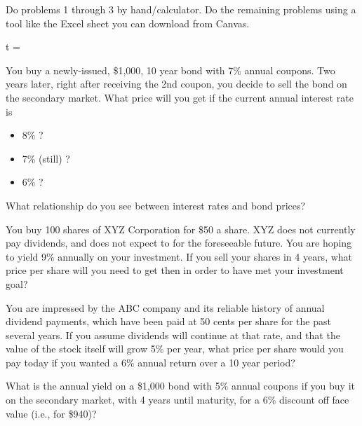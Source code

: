 \documentclass[12pt]{exam}
\begin{document}
\begin{flushleft}
    Do problems 1 through 3 by hand/calculator.  Do the remaining problems using a tool
    like the Excel sheet you can download from Canvas.
\end{flushleft}
\vspace{.5in}

t = 

\begin{questions}
    \question You buy a newly-issued, \$1,000, 10 year bond with 7\% annual coupons.  Two years
    later, right after receiving the 2nd coupon, you decide to sell the bond on the secondary market.
    What price will you get if the current annual interest rate is
    \begin{itemize}
        \item 8\% ?
        \item 7\% (still) ?
        \item 6\% ?
    \end{itemize}
    \vspace{1in}
    What relationship do you see between interest rates and bond prices?
    \vspace{.5in}

    \question You buy 100 shares of XYZ Corporation for \$50 a share.  XYZ does  not currently pay
    dividends, and does not expect to for the foreseeable future.  You are hoping to yield 9\%
    annually on your investment.  If you sell your shares in 4 years, what price per share will you
    need to get then in order to have met your investment goal?
    \vspace{1.25in}

    \question You are impressed by the ABC company and its reliable history of annual dividend payments, which
    have been paid at 50 cents per share for the past several years.  If you assume dividends will
    continue at that rate, and that the value of the stock itself will grow 5\% per year, what price
    per share would you pay today if you wanted a 6\% annual return over a 10 year period?
    \vspace{2in}

    \question What is the annual yield on a \$1,000 bond with 5\% annual coupons if you buy it on the secondary
    market, with 4 years until maturity, for a 6\% discount off face value (i.e., for \$940)?
    \vspace{1.5in}


\end{questions}
\end{document}
